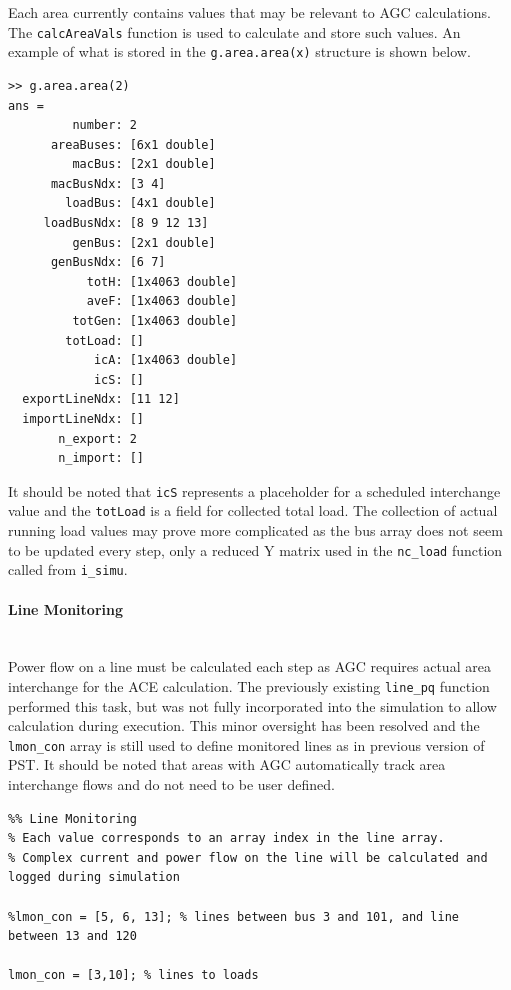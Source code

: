 \documentclass[12pt]{article}
\begin{document}
Each area currently contains values that may be relevant to AGC calculations.
The \verb|calcAreaVals| function is used to calculate and store such values.
An example of what is stored in the \verb|g.area.area(x)| structure is shown below.
\pagebreak
\begin{verbatim}
>> g.area.area(2)
ans = 
         number: 2
      areaBuses: [6x1 double]
         macBus: [2x1 double]
      macBusNdx: [3 4]
        loadBus: [4x1 double]
     loadBusNdx: [8 9 12 13]
         genBus: [2x1 double]
      genBusNdx: [6 7]
           totH: [1x4063 double]
           aveF: [1x4063 double]
         totGen: [1x4063 double]
        totLoad: []
            icA: [1x4063 double]
            icS: []
  exportLineNdx: [11 12]
  importLineNdx: []
       n_export: 2
       n_import: []
\end{verbatim}
It should be noted that \verb|icS| represents a placeholder for a scheduled interchange value and the \verb|totLoad|  is a field for collected total load.
The collection of actual running load values may prove more complicated as the bus array does not seem to be updated every step, only a reduced Y matrix used in the \verb|nc_load| function called from \verb|i_simu|. 
 
 
 
 
 \pagebreak
\paragraph{Line Monitoring} \ \\
Power flow on a line must be calculated each step as AGC requires actual area interchange for the ACE calculation.
The previously existing \verb|line_pq| function performed this task, but was not fully incorporated into the simulation to allow calculation during execution.
This minor oversight has been resolved and the \verb|lmon_con| array is still used to define monitored lines as in previous version of PST.
It should be noted that areas with AGC automatically track area interchange flows and do not need to be user defined.

\begin{verbatim}
%% Line Monitoring
% Each value corresponds to an array index in the line array.
% Complex current and power flow on the line will be calculated and logged during simulation

%lmon_con = [5, 6, 13]; % lines between bus 3 and 101, and line between 13 and 120

lmon_con = [3,10]; % lines to loads
\end{verbatim}
\end{document}
